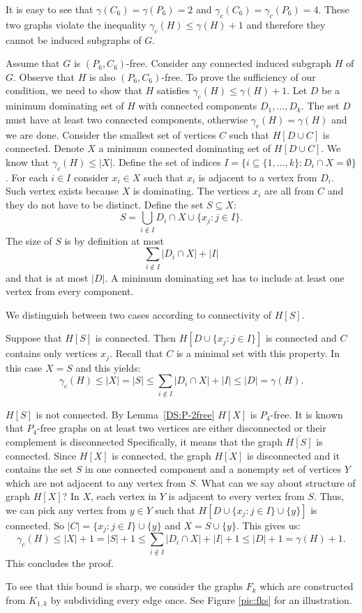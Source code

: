 \begin{myproof}
It is easy to see that \(\gamma(C_6) = \gamma(P_6) = 2\) and \(\gamma_c(C_6) = \gamma_c(P_6) = 4\).
These two graphs violate the inequality \(\gamma_c(H) \leq {\gamma(H) + 1}\) and therefore they cannot be induced subgraphs of \(G\).

Assume that \(G\) is \((P_6, C_6)\)-free.
Consider any connected induced subgraph \(H\) of \(G\). Observe that \(H\) is also \((P_6, C_6)\)-free.
To prove the sufficiency of our condition, we need to show that \(H\) satisfies \(\gamma_c(H) \leq {\gamma(H) + 1}\).
Let \(D\) be a minimum dominating set of \(H\) with connected components \(D_1, \dots, D_k\).
The set \(D\) must have at least two connected components, otherwise \(\gamma_c(H) = \gamma(H)\) and we are done.
Consider the smallest set of vertices \(C\) such that \(H[D \cup C]\) is connected.
Denote \(X\) a minimum connected dominating set of \(H[D \cup C]\). We know that \(\gamma_c(H) \leq |X|\).
	Define the set of indices \(I = \{i \subseteq \{1, \dots, k\}: D_i \cap X = \emptyset\}\). For each \(i \in I\) consider \(x_i \in X\) such that
\(x_i\) is adjacent to a vertex from \(D_i\). Such vertex exists because \(X\) is dominating. The vertices \(x_i\) are all from \(C\)
and they do not have to be distinct.
Define the set \(S \subseteq X\):
	\[S = \bigcup_{i \not\in I}{D_i \cap X} \cup \{x_j: j \in I\}.\]
The size of \(S\) is by definition at most
	\[ \sum_{i \not\in I}{|D_i \cap X|} + |I|\]
and that is at most \(|D|\).
A minimum dominating set has to include at least one vertex from every component.

We distinguish between two cases according to connectivity of \(H[S]\).

Suppose that \(H[S]\) is connected. Then \(H[D \cup \{x_j : j \in I\}]\) is connected and \(C\) contains only vertices \(x_j\).
Recall that \(C\) is a minimal set with this property.
In this case \(X = S\) and this yields:
	\[\gamma_c(H) \leq |X| = |S| \leq {\sum_{i \not\in I}{|D_i \cap X|} + |I|} \leq |D| = \gamma(H).\]

\(H[S]\) is not connected.
By Lemma~\ref{DS:P-2free} \(H[X]\) is \(P_4\)-free. 
It is known that \(P_4\)-free graphs on at least two vertices are either disconnected or
their complement is disconnected \cite{Corneil81}
Specifically, it means that the graph \(\overline{H[S]}\) is connected.
Since \(H[X]\) is connected, the graph \(\overline{H[X]}\) is disconnected and it contains the set \(S\) in one connected component and a nonempty set of vertices \(Y\)
which are not adjacent to any vertex from \(S\).
What can we say about structure of graph \(H[X]\)? 
In \(X\), each vertex in \(Y\) is adjacent to every vertex from \(S\).
Thus, we can pick any vertex from \(y \in Y\) such that \(H[D \cup \{x_j: j \in I\} \cup \{y\}]\) is connected.
So \(|C| = \{x_j: j \in I\} \cup \{y\}\) and \(X = S \cup \{y\}\).
This gives us: 
	\[\gamma_c(H) \leq {|X| + 1} = {|S| + 1} \leq {\sum_{i \not\in I}{|D_i \cap X|} + |I| + 1} \leq {|D| + 1} = \gamma(H) + 1.\]
This concludes the proof.
\end{myproof}
To see that this bound is sharp, we consider the graphs \(F_k\) which are constructed from \(K_{1, k}\)
by subdividing every edge once. See Figure \ref{pic:fks} for an illustration.

